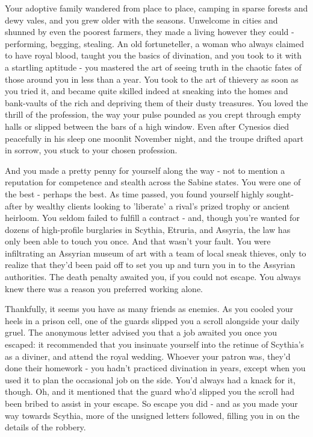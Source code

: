 \documentclass[char]{Kos}
\begin{document}
    Your adoptive family wandered from place to place, camping in sparse forests and dewy vales, and you grew older with the seasons. Unwelcome in cities and shunned by even the poorest farmers, they made a living however they could - performing, begging, stealing. An old fortuneteller, a woman who always claimed to have royal blood, taught you the basics of divination, and you took to it with a startling aptitude - you mastered the art of seeing truth in the chaotic fates of those around you in less than a year. You took to the art of thievery as soon as you tried it, and became quite skilled indeed at sneaking into the homes and bank-vaults of the rich and depriving them of their dusty treasures. You loved the thrill of the profession, the way your pulse pounded as you crept through empty halls or slipped between the bars of a high window. Even after Cynesios died peacefully in his sleep one moonlit November night, and the troupe drifted apart in sorrow, you stuck to your chosen profession. 

    And you made a pretty penny for yourself along the way - not to mention a reputation for competence and stealth across the Sabine states. You were one of the best - perhaps the best. As time passed, you found yourself highly sought-after by wealthy clients looking to 'liberate' a rival's prized trophy or ancient heirloom. You seldom failed to fulfill a contract - and, though you're wanted for dozens of high-profile burglaries in Scythia, Etruria, and Assyria, the law has only been able to touch you once. And that wasn't your fault. You were infiltrating an Assyrian museum of art with a team of local sneak thieves, only to realize that they'd been paid off to set you up and turn you in to the Assyrian authorities. The death penalty awaited you, if you could not escape. You always knew there was a reason you preferred working alone.

    Thankfully, it seems you have as many friends as enemies. As you cooled your heels in a prison cell, one of the guards slipped you a scroll alongside your daily gruel. The anonymous letter advised you that a job awaited you once you escaped: it recommended that you insinuate yourself into the retinue of Scythia's \cScythiaKing{\monarch} as a diviner, and attend the royal wedding. Whoever your patron was, they'd done their homework - you hadn't practiced divination in years, except when you used it to plan the occasional job on the side. You'd always had a knack for it, though. Oh, and it mentioned that the guard who'd slipped you the scroll had been bribed to assist in your escape. So escape you did - and as you made your way towards Scythia, more of the unsigned letters followed, filling you in on the details of the robbery. 
\end{document}
